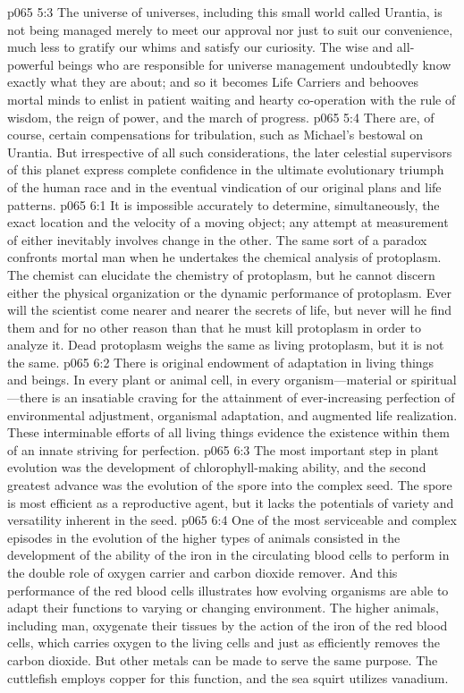 \vs p065 5:3 The universe of universes, including this small world called Urantia, is not being managed merely to meet our approval nor just to suit our convenience, much less to gratify our whims and satisfy our curiosity. The wise and all\hyp{}powerful beings who are responsible for universe management undoubtedly know exactly what they are about; and so it becomes Life Carriers and behooves mortal minds to enlist in patient waiting and hearty co\hyp{}operation with the rule of wisdom, the reign of power, and the march of progress.
\vs p065 5:4 There are, of course, certain compensations for tribulation, such as Michael’s bestowal on Urantia. But irrespective of all such considerations, the later celestial supervisors of this planet express complete confidence in the ultimate evolutionary triumph of the human race and in the eventual vindication of our original plans and life patterns.\plusone
{}
\vs p065 6:1 It is impossible accurately to determine, simultaneously, the exact location and the velocity of a moving object; any attempt at measurement of either inevitably involves change in the other. The same sort of a paradox confronts mortal man when he undertakes the chemical analysis of protoplasm. The chemist can elucidate the chemistry of  protoplasm, but he cannot discern either the physical organization or the dynamic performance of  protoplasm. Ever will the scientist come nearer and nearer the secrets of life, but never will he find them and for no other reason than that he must kill protoplasm in order to analyze it. Dead protoplasm weighs the same as living protoplasm, but it is not the same.
\pc \vs p065 6:2 There is original endowment of adaptation in living things and beings. In every  plant or animal cell, in every  organism---material or spiritual---there is an insatiable craving for the attainment of ever\hyp{}increasing perfection of environmental adjustment, organismal adaptation, and augmented life realization. These interminable efforts of all living things evidence the existence within them of an innate striving for perfection.
\vs p065 6:3 The most important step in plant evolution was the development of chlorophyll\hyp{}making ability, and the second greatest advance was the evolution of the spore into the complex seed. The spore is most efficient as a reproductive agent, but it lacks the potentials of variety and versatility inherent in the seed.
\vs p065 6:4 One of the most serviceable and complex episodes in the evolution of the higher types of animals consisted in the development of the ability of the iron in the circulating blood cells to perform in the double role of oxygen carrier and carbon dioxide remover. And this performance of the red blood cells illustrates how evolving organisms are able to adapt their functions to varying or changing environment. The higher animals, including man, oxygenate their tissues by the action of the iron of the red blood cells, which carries oxygen to the living cells and just as efficiently removes the carbon dioxide. But other metals can be made to serve the same purpose. The cuttlefish employs copper for this function, and the sea squirt utilizes vanadium.\plusone
